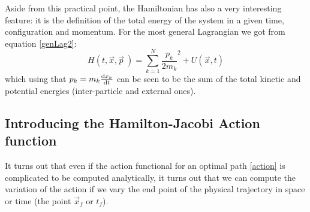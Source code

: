 \documentclass[11pt, a4paper]{article} %
\begin{document}
Aside from this practical point, the Hamiltonian has also a very interesting feature: it is the definition of the total energy of the system in a given time, configuration and momentum. For the most general Lagrangian we got from equation \eqref{genLag2}:
\begin{equation}
H(t, \vec{x},\vec{p}\ )=\sum_{k=1}^N \frac{p_k}{2m_k}^2+U(\vec{x},t)
\end{equation}
which using that $p_k=m_k\dv{x_k}{t}$ can be seen to be the sum of the total kinetic and potential energies (inter-particle and external ones).

\subsection*{Introducing the Hamilton-Jacobi Action function}
It turns out that even if the action functional for an optimal path \eqref{action} is complicated to be computed analytically, it turns out that we can compute the variation of the action if we vary the end point of the physical trajectory in space or time (the point $\vec{x}_f$ or $t_f$).
\end{document}
